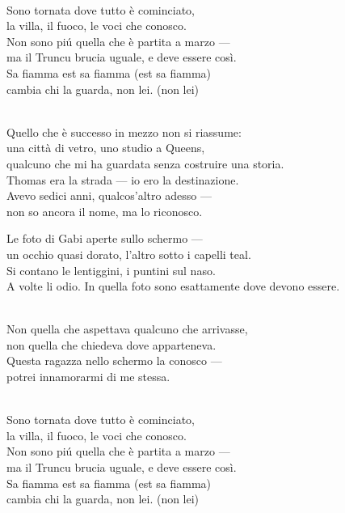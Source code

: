 \begin{lyrics}
\\
Sono tornata dove tutto è cominciato,\\
la villa, il fuoco, le voci che conosco.\\
Non sono piú quella che è partita a marzo —\\
ma il Truncu brucia uguale, e deve essere così.
\\
Sa fiamma est sa fiamma (est sa fiamma)\\
cambia chi la guarda, non lei. %
(non lei)

\\
Quello che è successo in mezzo non si riassume:\\
una città di vetro, uno studio a Queens,\\
qualcuno che mi ha guardata senza costruire una storia.\\
Thomas era la strada — io ero la destinazione.\\
Avevo sedici anni, qualcos'altro adesso —
\\
non so ancora il nome, ma lo riconosco.

Le foto di Gabi aperte sullo schermo —\\
un occhio quasi dorato, l'altro sotto i capelli teal.\\
Si contano le lentiggini, i puntini sul naso.
\\
A volte li odio. %
In quella foto sono esattamente dove devono essere.

\\
Non quella che aspettava qualcuno che arrivasse,\\
non quella che chiedeva dove apparteneva.\\
Questa ragazza nello schermo la conosco —\\
potrei innamorarmi di me stessa.

\\
Sono tornata dove tutto è cominciato,\\
la villa, il fuoco, le voci che conosco.\\
Non sono piú quella che è partita a marzo —\\
ma il Truncu brucia uguale, e deve essere così.
\\
Sa fiamma est sa fiamma (est sa fiamma)\\
cambia chi la guarda, non lei. %
(non lei)


\end{lyrics}
